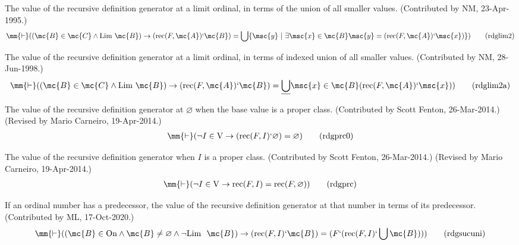 \begin{lemma} The value of the recursive definition
generator at a limit ordinal, in
       terms of the union of all smaller values.  (Contributed by NM,
       23-Apr-1995.)
\begin{align}
\mm{\vdash} ( ( \mc{B} \in \mc{C} \wedge {\rm Lim}~ \mc{B} ) \rightarrow ( {\rm
    rec} ( F , \mc{A} ) ` \mc{B} ) = \bigcup \{ \msc{y} ~\vert~ \exists \msc{x}
    \in \mc{B} \msc{y} = ( {\rm rec} ( F , \mc{A} ) ` \msc{x} ) \}
    )\label{eq:rdglim2}\tag{rdglim2}
\end{align}
\end{lemma}


\begin{lemma} The value of the recursive definition
generator at a limit ordinal, in
       terms of indexed union of all smaller values.  (Contributed by NM,
       28-Jun-1998.)
\begin{align}
\mm{\vdash} ( ( \mc{B} \in \mc{C} \wedge {\rm Lim}~ \mc{B} ) \rightarrow ( {\rm
    rec} ( F , \mc{A} ) ` \mc{B} ) = \underline{\bigcup} \msc{x} \in \mc{B} (
    {\rm rec} ( F , \mc{A} ) ` \msc{x} ) )\label{eq:rdglim2a}\tag{rdglim2a}
\end{align}
\end{lemma}


\begin{lemma} The value of the recursive definition
generator at $\varnothing$ when the base
       value is a proper class.  (Contributed by Scott Fenton, 26-Mar-2014.)
       (Revised by Mario Carneiro, 19-Apr-2014.)
\begin{align}
\mm{\vdash} ( \lnot I \in {\rm V} \rightarrow ( {\rm rec} ( F , I ) `
    \varnothing ) = \varnothing )\label{eq:rdgprc0}\tag{rdgprc0}
\end{align}
\end{lemma}


\begin{lemma} The value of the recursive definition
generator when $I$ is a proper
       class.  (Contributed by Scott Fenton, 26-Mar-2014.)  (Revised by Mario
       Carneiro, 19-Apr-2014.)
\begin{align}
\mm{\vdash} ( \lnot I \in {\rm V} \rightarrow {\rm rec} ( F , I ) = {\rm rec} (
    F , \varnothing ) )\label{eq:rdgprc}\tag{rdgprc}
\end{align}
\end{lemma}


\begin{lemma} If an ordinal number has a predecessor,
the value of the recursive
     definition generator at that number in terms of its predecessor.
     (Contributed by ML, 17-Oct-2020.)
\begin{align}
\mm{\vdash} ( ( \mc{B} \in {\rm On} \wedge \mc{B} \ne \varnothing \wedge \lnot
    {\rm Lim}~~ \mc{B} ) \rightarrow ( {\rm rec} ( F , I ) ` \mc{B} ) = ( F ` (
    {\rm rec} ( F , I ) ` \bigcup \mc{B} ) )
    )\label{eq:rdgsucuni}\tag{rdgsucuni}
\end{align}
\end{lemma}


